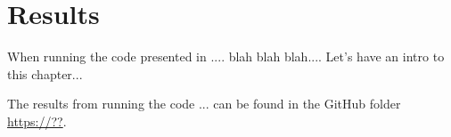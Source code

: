 \chapter{Results}
\label{chap:Results}
When running the code presented in .... blah blah blah....
Let's have an intro to this chapter...

The results from running the code ... can be found in the GitHub folder  \url{https://??}.
